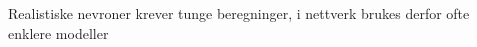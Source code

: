 \documentclass[presentation]{beamer}
\begin{document}
\begin{frame}{Realistiske nevroner krever tunge beregninger, i nettverk brukes derfor ofte enklere modeller}
\begin{figure}
\end{figure}
\end{frame}
\end{document}
